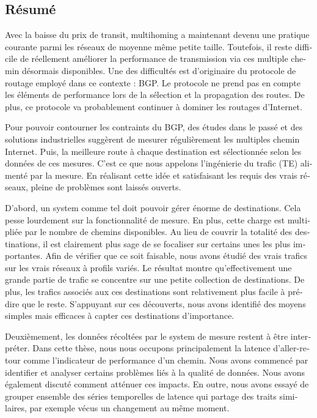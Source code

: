 \iffalse
\begin{otherlanguage}{french}
\chapter*{Résumé}
Avec la baisse du prix de transit, multihoming a maintenant devenu une pratique courante parmi les réseaux de moyenne même petite taille.
Toutefois, il reste difficile de réellement améliorer la performance de transmission via ces multiple chemin désormais disponibles.
Une des difficultés est d’originaire du protocole de routage employé dans ce contexte : \acf{BGP}.
Le protocole ne prend pas en compte les éléments de performance lors de la sélection et la propagation des routes.
De plus, ce protocole va probablement continuer à dominer les routages d’Internet.

Pour pouvoir contourner les contraints du \ac{BGP}, des études dans le passé et des solutions industrielles suggèrent de mesurer régulièrement les multiples chemin Internet.
Puis, la meilleure route à chaque destination est sélectionnée selon les données de ces mesures. C’est ce que nous appelons l’ingénierie du trafic (TE) alimenté par la mesure.
En réalisant cette idée et satisfaisant les requis des vrais réseaux, pleine de problèmes sont laissés ouverts.

D’abord, un system comme tel doit pouvoir gérer énorme de destinations.
Cela pesse lourdement sur la fonctionnalité de mesure.
En plus, cette charge est multipliée par le nombre de chemins disponibles.
Au lieu de couvrir la totalité des destinations, il est clairement plus sage de se focaliser sur certains unes les plus importantes.
Afin de vérifier que ce soit faisable, nous avons étudié des vrais trafics sur les vrais réseaux à profils variés.
Le résultat montre qu’effectivement une grande partie de trafic se concentre sur une petite collection de destinations.
De plus, les trafics associés aux ces destinations sont relativement plus facile à prédire que le reste.
S’appuyant sur ces découverts, nous avons identifié des moyens simples mais efficaces à capter ces destinations d’importance.

Deuxièmement, les données récoltées par le system de mesure restent à être interpréter.
Dans cette thèse, nous nous occupons principalement la latence d’aller-retour comme l’indicateur de performance d’un chemin.
Nous avons commencé par identifier et analyser certains problèmes liés à la qualité de données.
Nous avons également discuté comment atténuer ces impacts.
En outre, nous avons essayé de grouper ensemble des séries temporelles de latence qui partage des traits similaires, par exemple vécus un changement au même moment.


\end{otherlanguage}
